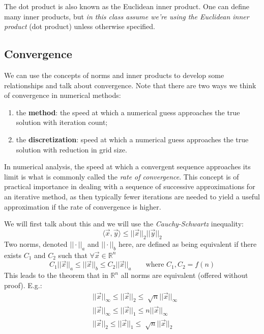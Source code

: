 \documentclass[12pt]{article}
\begin{document}
The dot product is also known as the Euclidean inner product. One can define many inner products, but \textit{in this class assume we're using the Euclidean inner product} (dot product) unless otherwise specified. 

\subsection*{Convergence}
We can use the concepts of norms and inner products to develop some relationships and talk about convergence. Note that there are two ways we think of convergence in numerical methods:
\begin{enumerate}
\item the \textbf{method}: the speed at which a numerical guess approaches the true solution with iteration count;
\item the \textbf{discretization}: speed at which a numerical guess approaches the true solution with reduction in  grid size.
\end{enumerate}

In numerical analysis, the speed at which a convergent sequence approaches its limit is what is commonly called the \textit{rate of convergence}. This concept is of practical importance in dealing with a sequence of successive approximations for an iterative method, as then typically fewer iterations are needed to yield a useful approximation if the rate of convergence is higher. 

We will first talk about this and we will use the \textit{Cauchy-Schwartz} inequality:
%
\begin{equation}
\langle \vec{x}, \vec{y} \rangle \leq ||\vec{x}||_2 ||\vec{y}||_2 \nonumber
\end{equation}
%
Two norms, denoted $|| \cdot ||_a$ and $|| \cdot ||_b$ here, are defined as being equivalent if there exists $C_1$ and $C_2$ such that $\forall \vec{x} \in \mathbb{R}^n$
%
\begin{equation}
C_1 ||\vec{x}||_a \leq ||\vec{x}||_b \leq C_2 ||\vec{x}||_a \qquad \text{where } C_1, C_2 = f(n) \nonumber
\end{equation}
%
This leads to the theorem that in $\mathbb{R}^n$ all norms are equivalent (offered without proof). E.g.:
\begin{align}
& ||\vec{x}||_{\infty} \leq ||\vec{x}||_2 \leq \sqrt[]{n} ||\vec{x}||_{\infty} \nonumber \\
%
& ||\vec{x}||_{\infty} \leq ||\vec{x}||_1 \leq n ||\vec{x}||_{\infty} \nonumber \\
%
& ||\vec{x}||_2 \leq ||\vec{x}||_1 \leq \sqrt[]{n} ||\vec{x}||_2 \nonumber
\end{align}
\end{document}
